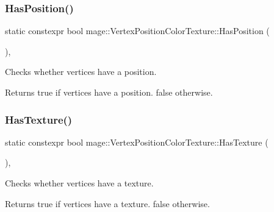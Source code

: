 \subsubsection{\texorpdfstring{Has\+Position()}{HasPosition()}}
{\footnotesize\ttfamily static constexpr bool mage\+::\+Vertex\+Position\+Color\+Texture\+::\+Has\+Position (\begin{DoxyParamCaption}{ }\end{DoxyParamCaption})\hspace{0.3cm}{\ttfamily [static]}, {\ttfamily [noexcept]}}

Checks whether vertices have a position.

\begin{DoxyReturn}{Returns}
{\ttfamily true} if vertices have a position. {\ttfamily false} otherwise. 
\end{DoxyReturn}
\hypertarget{structmage_1_1_vertex_position_color_texture_aac2da4c1e9233e6c480c4629718f0a1e}{}\label{structmage_1_1_vertex_position_color_texture_aac2da4c1e9233e6c480c4629718f0a1e} 
\subsubsection{\texorpdfstring{Has\+Texture()}{HasTexture()}}
{\footnotesize\ttfamily static constexpr bool mage\+::\+Vertex\+Position\+Color\+Texture\+::\+Has\+Texture (\begin{DoxyParamCaption}{ }\end{DoxyParamCaption})\hspace{0.3cm}{\ttfamily [static]}, {\ttfamily [noexcept]}}

Checks whether vertices have a texture.

\begin{DoxyReturn}{Returns}
{\ttfamily true} if vertices have a texture. {\ttfamily false} otherwise. 
\end{DoxyReturn}
\hypertarget{structmage_1_1_vertex_position_color_texture_a1107e506bac58213e80035f85d3e0819}{}\label{structmage_1_1_vertex_position_color_texture_a1107e506bac58213e80035f85d3e0819} 
